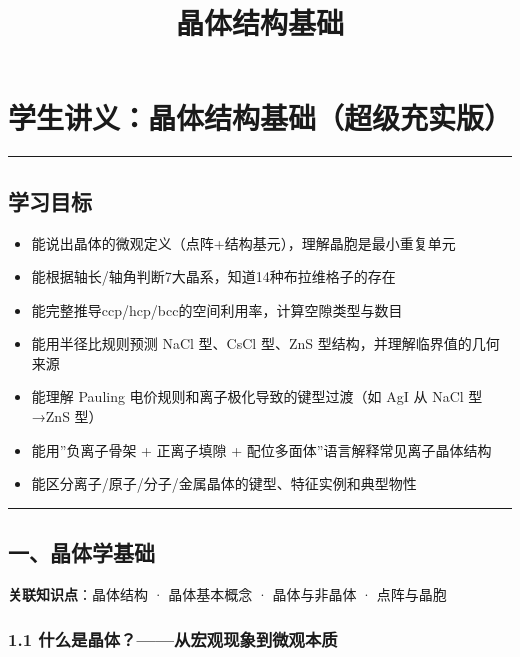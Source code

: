 \documentclass[a4paper,11pt]{ctexart}
\title{晶体结构基础}
\date{}
\providecommand{\tightlist}{\setlength{\itemsep}{0pt}\setlength{\parskip}{0pt}}
\begin{document}
\maketitle
\tableofcontents
\newpage
\section{学生讲义：晶体结构基础（超级充实版）}\label{ux5b66ux751fux8bb2ux4e49ux6676ux4f53ux7ed3ux6784ux57faux7840ux8d85ux7ea7ux5145ux5b9eux7248}

\begin{center}\rule{0.5\linewidth}{0.5pt}\end{center}

\subsection{学习目标}\label{ux5b66ux4e60ux76eeux6807}

\begin{itemize}
\tightlist
\item
  能说出晶体的微观定义（点阵+结构基元），理解晶胞是最小重复单元
\item
  能根据轴长/轴角判断7大晶系，知道14种布拉维格子的存在
\item
  能完整推导ccp/hcp/bcc的空间利用率，计算空隙类型与数目
\item
  能用半径比规则预测 NaCl 型、CsCl 型、ZnS 型结构，并理解临界值的几何来源
\item
  能理解 Pauling 电价规则和离子极化导致的键型过渡（如 AgI 从 NaCl 型→ZnS 型）
\item
  能用''负离子骨架 + 正离子填隙 + 配位多面体''语言解释常见离子晶体结构
\item
  能区分离子/原子/分子/金属晶体的键型、特征实例和典型物性
\end{itemize}

\begin{center}\rule{0.5\linewidth}{0.5pt}\end{center}

\subsection{一、晶体学基础}\label{ux4e00ux6676ux4f53ux5b66ux57faux7840}

\textbf{关联知识点}：晶体结构 · 晶体基本概念 · 晶体与非晶体 · 点阵与晶胞

\subsubsection{1.1 什么是晶体？------从宏观现象到微观本质}\label{ux4ec0ux4e48ux662fux6676ux4f53ux4eceux5b8fux89c2ux73b0ux8c61ux5230ux5faeux89c2ux672cux8d28}
\end{document}
